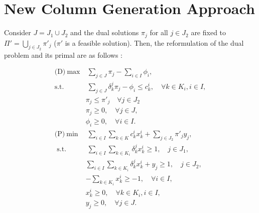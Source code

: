 \documentclass[12pt]{article}
\begin{document}
	
	\section{New Column Generation Approach}
	Consider $J = J_1 \cup J_2$ and the dual solutions $\pi_j$ for all $j \in J_2$ are fixed to $\Pi' = \bigcup_{j \in J_2} \pi'_j$ ($\pi'$ is a feasible solution). Then, the reformulation of the dual problem and its primal are as follows : 
	
	\begin{align*}
		\text{(D)}~   \max& ~ \sum _ { j \in J } \pi _ { j } - \sum _ { i \in I } \phi _ { i }, \\
	\text{s.t. } & ~ \sum _ { j \in J } \delta _ { k } ^ { j } \pi _ { j } - \phi _ { i } \leq c _ { k } ^ { i } , \quad \forall k \in K _ { i } , i \in I, \\
	& \pi_j \leq \pi'_j \quad \forall j \in J_2 \\
	&\pi _ { j } \geq 0 , \quad \forall j \in J ,\\
	&\phi _ { i } \geq 0 , \quad \forall i \in I. \\[5mm]
	\text{(P)}~ \min& ~ \sum _ { i \in I } \sum _ { k \in K } c _ { k } ^ { i } x _ { k } ^ { i } + \sum_{ j \in J_2 } \pi'_j y_j,\\
	\text { s.t. }&  ~ \sum _ { i \in I } \sum _ { k \in K _ { i } } \delta _ { k } ^ { j } x _ { k } ^ { i } \geq 1 , \quad j \in J_1, \\
	& \sum _ { i \in I } \sum _ { k \in K _ { i } } \delta _ { k } ^ { j } x _ { k } ^ { i } + y_j \geq 1 , \quad j \in J_2, \\
	&- \sum _ { k \in K _ { i } } x _ { k } ^ { i } \geq - 1 , \quad \forall i \in I ,\\
	&x _ { k } ^ { i } \geq 0 , \quad \forall k \in K _ { i } , i \in I, \\
	&y_j \geq 0, \quad \forall j \in J.
	\end{align*}
	
	
\end{document}
